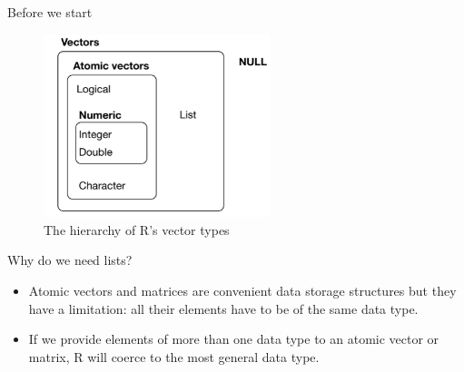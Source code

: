 \documentclass[ignorenonframetext,]{beamer}
\begin{document}
\begin{frame}{Before we start}
\protect\hypertarget{before-we-start-1}{}

\begin{figure}
\centering
\includegraphics[width=2.60417in,height=\textheight]{figures/vec}
\caption{The hierarchy of R's vector types}
\end{figure}

\end{frame}

\begin{frame}{Why do we need lists?}
\protect\hypertarget{why-do-we-need-lists}{}

\begin{itemize}
\item
  Atomic vectors and matrices are convenient data storage structures but
  they have a limitation: all their elements have to be of the same data
  type.
\item
  If we provide elements of more than one data type to an atomic vector
  or matrix, R will coerce to the most general data type.
\end{itemize}

\end{frame}
\end{document}
